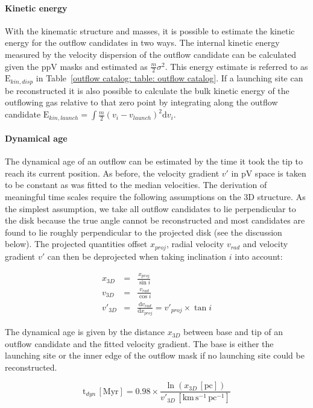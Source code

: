 \paragraph{Kinetic energy}
With the kinematic structure and masses, it is possible to estimate the kinetic energy for the outflow candidates in two ways.
The internal kinetic energy measured by the velocity dispersion of the outflow candidate can be calculated given the ppV masks and estimated as $\frac{m}{2} \sigma^2$. This energy estimate is referred to as $\mathrm{E}_{kin,disp}$ in Table~\ref{outflow catalog: table: outflow catalog}.
If a launching site can be reconstructed it is also possible to calculate the bulk kinetic energy of the outflowing gas relative to that zero point by integrating along the outflow candidate $\mathrm{E}_{kin,launch} = \int \frac{m}{2} \left( v_i - v_{launch} \right)^2 \mathrm{d}v_i$.

\paragraph{Dynamical age}
The dynamical age of an outflow can be estimated by the time it took the tip to reach its current position. As before, the velocity gradient $v'$ in pV space is taken to be constant as was fitted to the median velocities.
The derivation of meaningful time scales require the following assumptions on the 3D structure.
As the simplest assumption, we take all outflow candidates to lie perpendicular to the disk because the true angle cannot be reconstructed and most candidates are found to lie roughly perpendicular to the projected disk (see the discussion below). The projected quantities offset $x_{proj}$, radial velocity $v_{rad}$ and velocity gradient $v'$ can then be deprojected when taking inclination $i$ into account:

\begin{eqnarray}
	x_{3D} &=& \frac{x_{proj}}{\sin i} \nonumber\\
	v_{3D} &=& \frac{v_{rad}}{\cos i} \nonumber\\
	v'_{3D} &=& \frac{\mathrm{d}v_{rad}}{\mathrm{d}x_{proj}} = v'_{proj} \times \tan i \nonumber
\end{eqnarray}

The dynamical age is given by the distance $x_{3D}$ between base and tip of an outflow candidate and the fitted velocity gradient. The base is either the launching site or the inner edge of the outflow mask if no launching site could be reconstructed.

\begin{displaymath}
	\mathrm{t}_{dyn}\,[\mathrm{Myr}] = 0.98 \times \frac{\ln \left( x_{3D}\,[\mathrm{pc}] \right)}{v'_{3D}\,[\mathrm{km}\,\mathrm{s}^{-1}\,\mathrm{pc}^{-1}]}
\end{displaymath}

